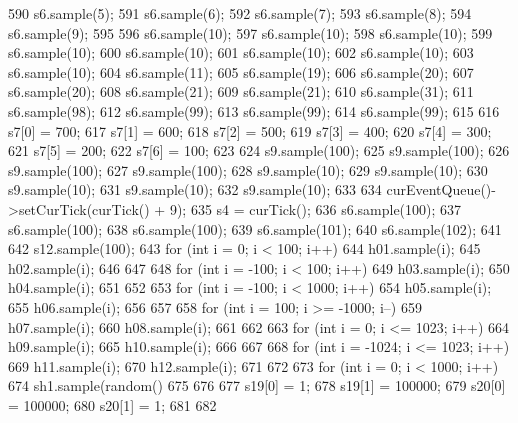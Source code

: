 \begin{DoxyCode}
{590     s6.sample(5);
591     s6.sample(6);
592     s6.sample(7);
593     s6.sample(8);
594     s6.sample(9);
595 
596     s6.sample(10);
597     s6.sample(10);
598     s6.sample(10);
599     s6.sample(10);
600     s6.sample(10);
601     s6.sample(10);
602     s6.sample(10);
603     s6.sample(10);
604     s6.sample(11);
605     s6.sample(19);
606     s6.sample(20);
607     s6.sample(20);
608     s6.sample(21);
609     s6.sample(21);
610     s6.sample(31);
611     s6.sample(98);
612     s6.sample(99);
613     s6.sample(99);
614     s6.sample(99);
615 
616     s7[0] = 700;
617     s7[1] = 600;
618     s7[2] = 500;
619     s7[3] = 400;
620     s7[4] = 300;
621     s7[5] = 200;
622     s7[6] = 100;
623 
624     s9.sample(100);
625     s9.sample(100);
626     s9.sample(100);
627     s9.sample(100);
628     s9.sample(10);
629     s9.sample(10);
630     s9.sample(10);
631     s9.sample(10);
632     s9.sample(10);
633 
634     curEventQueue()->setCurTick(curTick() + 9);
635     s4 = curTick();
636     s6.sample(100);
637     s6.sample(100);
638     s6.sample(100);
639     s6.sample(101);
640     s6.sample(102);
641 
642     s12.sample(100);
643     for (int i = 0; i < 100; i++) {
644         h01.sample(i);
645         h02.sample(i);
646     }
647 
648     for (int i = -100; i < 100; i++) {
649         h03.sample(i);
650         h04.sample(i);
651     }
652 
653     for (int i = -100; i < 1000; i++) {
654         h05.sample(i);
655         h06.sample(i);
656     }
657 
658     for (int i = 100; i >= -1000; i--) {
659         h07.sample(i);
660         h08.sample(i);
661     }
662 
663     for (int i = 0; i <= 1023; i++) {
664         h09.sample(i);
665         h10.sample(i);
666     }
667 
668     for (int i = -1024; i <= 1023; i++) {
669         h11.sample(i);
670         h12.sample(i);
671     }
672 
673     for (int i = 0; i < 1000; i++) {
674         sh1.sample(random() %
675     }
676 
677     s19[0] = 1;
678     s19[1] = 100000;
679     s20[0] = 100000;
680     s20[1] = 1;
681 
682 }
\end{DoxyCode}


